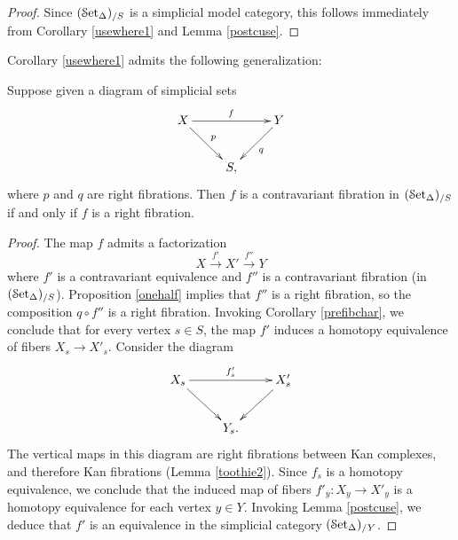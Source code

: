 \begin{proof}
Since $(\operatorname{\mathcal{S}et_{\Delta}})_{/S}$ is a simplicial model category, this follows immediately
from Corollary \ref{usewhere1} and Lemma \ref{postcuse}.
\end{proof}

Corollary \ref{usewhere1} admits the following generalization:

\begin{corollary}\label{usewhere2}
Suppose given a diagram of simplicial sets
$$ \xymatrix{ X \ar[rr]^{f} \ar[dr]^{p} & & Y \ar[dl]^{q} \\
& S, & }$$
where $p$ and $q$ are right fibrations. Then $f$ is a contravariant fibration in
$(\operatorname{\mathcal{S}et_{\Delta}})_{/S}$ if and only if $f$ is a right fibration.
\end{corollary}

\begin{proof}
The map $f$ admits a factorization
$$ X \stackrel{f'}{\rightarrow} X' \stackrel{f''}{\rightarrow} Y$$
where $f'$ is a contravariant equivalence and $f''$ is a contravariant fibration (in $(\operatorname{\mathcal{S}et_{\Delta}})_{/S}$). 
Proposition \ref{onehalf} implies that $f''$ is a right fibration, so the composition
$q \circ f''$ is a right fibration. Invoking Corollary \ref{prefibchar}, we conclude that
for every vertex $s \in S$, the map $f'$ induces a homotopy equivalence of fibers
$X_{s} \rightarrow X'_{s}$. Consider the diagram
$$ \xymatrix{ X_{s} \ar[rr]^{f'_s} \ar[dr] & & X'_{s} \ar[dl] \\
& Y_{s}. & }$$
The vertical maps in this diagram are right fibrations between Kan complexes, and therefore
Kan fibrations (Lemma \ref{toothie2}). Since $f_{s}$ is a homotopy equivalence, we conclude
that the induced map of fibers $f'_{y}: X_{y} \rightarrow X'_{y}$ is a homotopy equivalence
for each vertex $y \in Y$. Invoking Lemma \ref{postcuse}, we deduce that
$f'$ is an equivalence in the simplicial category $(\operatorname{\mathcal{S}et_{\Delta}})_{/Y}$.


\end{proof}
